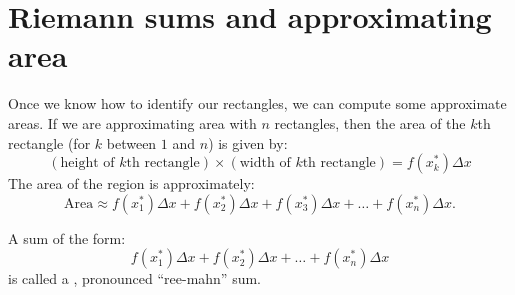 \documentclass{ximera}
\begin{document}
\section{Riemann sums and approximating area}

Once we know how to identify our rectangles, we can compute some
approximate areas. If we are approximating area with $n$ rectangles, then 
the area of the $k$th rectangle (for $k$ between $1$ and $n$) is given by:
\[ (\text{height of $k$th rectangle}) \times (\text{width of $k$th rectangle})
	= f(x_k^*) \Delta x \] 
The area of the region is approximately:
\[  \text{Area} \approx  
	f(x_1^*)\Delta x +  f(x_2^*)\Delta x +   f(x_3^*)\Delta x + \dots +   f(x_n^*)\Delta x.  \]
\begin{definition}
  A sum of the form:
  \[ f(x_1^*)\Delta x +  f(x_2^*)\Delta x + \dots +   f(x_n^*)\Delta x \]
  is called a , pronounced ``ree-mahn'' sum. 
\end{definition}
\end{document}
